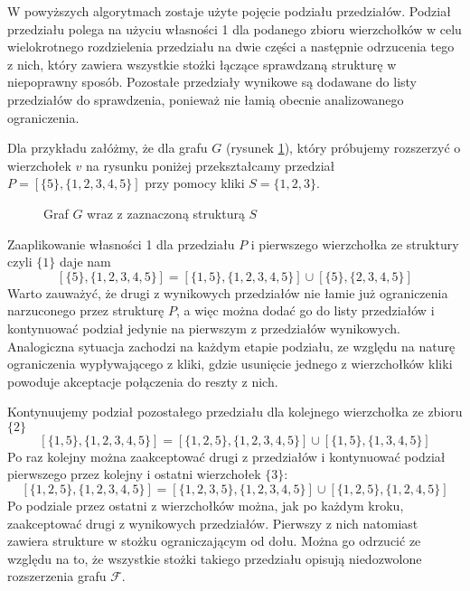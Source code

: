 W powyższych algorytmach zostaje użyte pojęcie podziału przedziałów. Podział przedziału polega na użyciu własności 1 dla podanego zbioru wierzchołków w celu wielokrotnego rozdzielenia przedziału na dwie części a następnie odrzucenia tego z nich, który zawiera wszystkie stożki łączące sprawdzaną strukturę w niepoprawny sposób. Pozostałe przedziały wynikowe są dodawane do listy przedziałów do sprawdzenia, ponieważ nie łamią obecnie analizowanego ograniczenia. 

Dla przykładu załóżmy, że dla grafu $G$ (rysunek \ref{SKlika}), który próbujemy rozszerzyć o wierzchołek $v$ na rysunku poniżej przekształcamy przedział $P =[\{5\},\{1,2,3,4,5\}]$ przy pomocy kliki $S = \{1,2,3\}$.
\begin{figure}[H]
  \centering
    \caption{Graf $G$ wraz z zaznaczoną strukturą $S$}
    \label{SKlika}
 \end{figure}
 

 Zaaplikowanie własności 1 dla przedziału $P$ i pierwszego wierzchołka ze struktury czyli $\{1\}$ daje nam  
$$[\{5\},\{1,2,3,4,5\}] = [\{1,5\},\{1,2,3,4,5\}] \cup [\{5\},\{2,3,4,5\}]$$ 
Warto zauważyć, że drugi z wynikowych przedziałów nie łamie już ograniczenia narzuconego przez strukturę $P$, a więc można dodać go do listy przedziałów i kontynuować podział jedynie na pierwszym z przedziałów wynikowych. Analogiczna sytuacja zachodzi na każdym etapie podziału, ze względu na naturę ograniczenia wypływającego z kliki, gdzie usunięcie jednego z wierzchołków kliki powoduje akceptacje połączenia do reszty z nich. 

Kontynuujemy podział pozostałego przedziału dla kolejnego wierzchołka ze zbioru $\{2\}$
$$[\{1,5\},\{1,2,3,4,5\}] = [\{1,2,5\},\{1,2,3,4,5\}] \cup [\{1,5\},\{1,3,4,5\}]$$ 
Po raz kolejny można zaakceptować drugi z przedziałów i kontynuować podział pierwszego przez kolejny i ostatni wierzchołek $\{3\}$: 
$$[\{1,2,5\},\{1,2,3,4,5\}] = [\{1,2,3,5\},\{1,2,3,4,5\}] \cup [\{1,2,5\},\{1,2,4,5\}]$$
Po podziale przez ostatni z wierzchołków można, jak po każdym kroku, zaakceptować drugi z wynikowych przedziałów. Pierwszy z nich natomiast zawiera strukture w stożku ograniczającym od dołu. Można go odrzucić ze względu na to, że wszystkie stożki takiego przedziału opisują niedozwolone rozszerzenia grafu $\mathcal{F}$.

